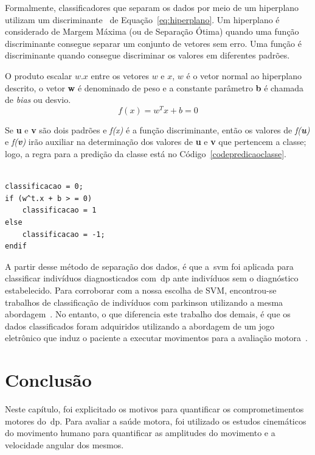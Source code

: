 Formalmente, classificadores que separam os dados por meio de um hiperplano utilizam um discriminante~\cite{valt2010} de Equação~\ref{eq:hiperplano}. Um hiperplano é considerado de Margem Máxima (ou de Separação Ótima) quando uma função discriminante consegue separar um conjunto de vetores sem erro. Uma função é discriminante quando consegue discriminar os valores em diferentes padrões. 

O produto escalar $ w.x $ entre os vetores $ w $ e $ x $, $ w $ é o vetor normal ao hiperplano descrito, o vetor \textbf{w} é denominado de peso e a constante parâmetro \textbf{b} é chamada de \textit{bias} ou desvio.
\linebreak
\begin{equation}
f(x)=w^Tx+b=0
\label{eq:hiperplano}
\end{equation}

Se \textbf{u} e \textbf{v} são dois padrões e \textit{f(x)} é a função discriminante, então os valores de \textit{f(\textbf{u})} e \textit{f(\textbf{v})} irão auxiliar na determinação dos valores de \textbf{u} e \textbf{v} que pertencem a classe; logo, a regra para a predição da classe está no Código~\ref{codepredicaoclasse}. 

\begin{lstlisting}[frame=single, caption=Código de Predição da Classes, label=codepredicaoclasse]  % Start your code-block

classificacao = 0;
if (w^t.x + b > = 0)
	classificacao = 1
else
	classificacao = -1;
endif
\end{lstlisting}

A partir desse método de separação dos dados, é que a~\ac{svm} foi aplicada para classificar indivíduos diagnosticados com~\ac{dp} ante indivíduos sem o diagnóstico estabelecido. Para corroborar com a nossa escolha de SVM, encontrou-se trabalhos de classificação de indivíduos com parkinson utilizando a mesma abordagem~\cite{bradmonitor2015,svmparkinson2010,patel_monitoring_2009}. No entanto, o que diferencia este trabalho dos demais, é que os dados classificados foram adquiridos utilizando a abordagem de um jogo eletrônico que induz o paciente a executar movimentos para a avaliação motora~\cite{quantitativeparkinson2011,wiiassesspark2016}. 


\section{Conclusão}
Neste capítulo, foi explicitado os motivos para quantificar os comprometimentos motores do~\ac{dp}. Para avaliar a saúde motora, foi utilizado os estudos cinemáticos do movimento humano para quantificar as amplitudes do movimento e a velocidade angular dos mesmos. 


